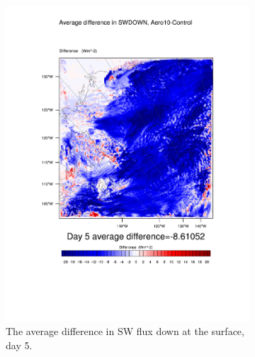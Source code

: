 \begin{figure}
\centering
	\begin{subfigure}{0.48\textwidth}
		\includegraphics[width=\textwidth]{results/aero10/diff_Aero10_SWDOWN_Day5.pdf}
		\caption{The average difference in SW flux down at the surface, day 5.}
		\label{subfig:swdown_r3Day5}
	\end{subfigure}
	\quad
	\begin{subfigure}{0.48\textwidth}
		\centering

\end{subfigure}
\end{figure}
